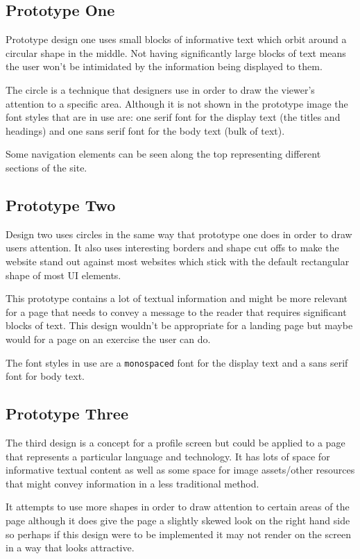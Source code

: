 \subsection{Prototype One}

Prototype design one uses small blocks of informative text which orbit around a circular shape in the middle. Not having significantly large blocks of text means the user won't be intimidated by the information being displayed to them.

The circle is a technique that designers use in order to draw the viewer's attention to a specific area. Although it is not shown in the prototype image the font styles that are in use are: one serif font for the display text (the titles and headings) and one sans serif font for the body text (bulk of text).

Some navigation elements can be seen along the top representing different sections of the site.

\subsection{Prototype Two}

Design two uses circles in the same way that prototype one does in order to draw users attention. It also uses interesting borders and shape cut offs to make the website stand out against most websites which stick with the default rectangular shape of most UI elements.

This prototype contains a lot of textual information and might be more relevant for a page that needs to convey a message to the reader that requires significant blocks of text. This design wouldn't be appropriate for a landing page but maybe would for a page on an exercise the user can do.

The font styles in use are a \texttt{monospaced} font for the display text and a sans serif font for body text.

\subsection{Prototype Three}

The third design is a concept for a profile screen but could be applied to a page that represents a particular language and technology. It has lots of space for informative textual content as well as some space for image assets/other resources that might convey information in a less traditional method.

It attempts to use more shapes in order to draw attention to certain areas of the page although it does give the page a slightly skewed look on the right hand side so perhaps if this design were to be implemented it may not render on the screen in a way that looks attractive.

